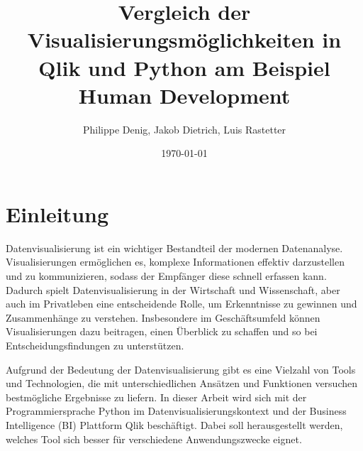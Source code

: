 \documentclass[12pt]{article}
\begin{document}
	
	\title{Vergleich der Visualisierungsmöglichkeiten in Qlik und Python am Beispiel Human Development}
	\author{Philippe Denig, Jakob Dietrich, Luis Rastetter}
	\date{\today}
	
	\maketitle
	
	\newpage
	
	\tableofcontents
	
	\newpage
	
	
	\section{Einleitung} %
	
	
	Datenvisualisierung ist ein wichtiger Bestandteil der modernen Datenanalyse. Visualisierungen ermöglichen es, komplexe Informationen effektiv darzustellen und zu kommunizieren, sodass der Empfänger diese schnell erfassen kann. Dadurch spielt Datenvisualisierung in der Wirtschaft und Wissenschaft, aber auch im Privatleben eine entscheidende Rolle, um Erkenntnisse zu gewinnen und Zusammenhänge zu verstehen. Insbesondere im Geschäftsumfeld können Visualisierungen dazu beitragen, einen Überblick zu schaffen und so bei Entscheidungsfindungen zu unterstützen.
	
	Aufgrund der Bedeutung der Datenvisualisierung gibt es eine Vielzahl von Tools und Technologien, die mit unterschiedlichen Ansätzen und Funktionen versuchen bestmögliche Ergebnisse zu liefern. In dieser Arbeit wird sich mit der Programmiersprache Python im Datenvisualisierungskontext und der Business Intelligence (BI) Plattform Qlik beschäftigt. Dabei soll herausgestellt werden, welches Tool sich besser für verschiedene Anwendungszwecke eignet.
	
\end{document}
